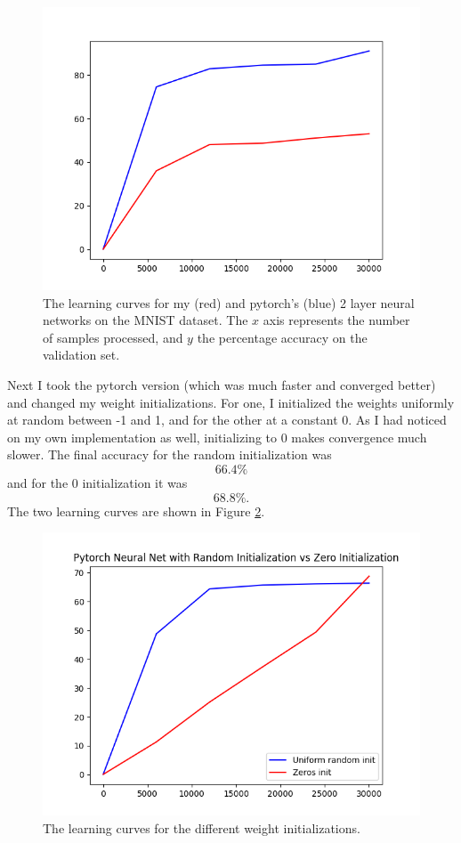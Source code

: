 \documentclass[a4paper]{article}
\theoremstyle{definition}
\begin{document}
\begin{enumerate}
	
	\begin{figure}[h]
		\centering
		\includegraphics[scale=.5]{learning_curves.png}
		\caption{The learning curves for my (red) and pytorch's (blue) 2 layer neural networks on the MNIST dataset. The $ x $ axis represents the number of samples processed, and $ y $ the percentage accuracy on the validation set.}\label{fig1}
	\end{figure}
	
	
	Next I took the pytorch version (which was much faster and converged better) and changed my weight initializations. For one, I initialized the weights uniformly at random between -1 and 1, and for the other at a constant 0. As I had noticed on my own implementation as well, initializing to 0 makes convergence much slower. The final accuracy for the random initialization was
	\[ 66.4\% \]
	and for the 0 initialization it was
	\[ 68.8\%. \]
	The two learning curves are shown in Figure \ref{fig2}.
	
	\begin{figure}[h]
		\centering
		\includegraphics[scale=.5]{inits.png}
		\caption{The learning curves for the different weight initializations.}\label{fig2}
	\end{figure}
	
	\end{enumerate}
	
\end{document}
